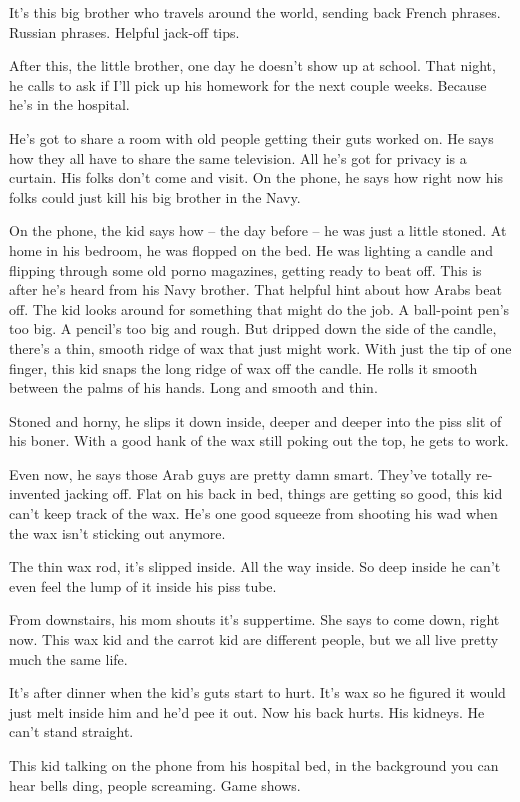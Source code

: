 \documentclass[10pt,a5paper,twoside]{book}
\begin{document}
It's this big brother who travels around the world, sending back French phrases. Russian phrases. Helpful jack-off tips.

After this, the little brother, one day he doesn't show up at school. That night, he calls to ask if I'll pick up his homework for the next couple weeks. Because he's in the hospital.

He's got to share a room with old people getting their guts worked on. He says how they all have to share the same television. All he's got for privacy is a curtain. His folks don't come and visit. On the phone, he says how right now his folks could just kill his big brother in the Navy.

On the phone, the kid says how -- the day before -- he was just a little stoned. At home in his bedroom, he was flopped on the bed. He was lighting a candle and flipping through some old porno magazines, getting ready to beat off. This is after he's heard from his Navy brother. That helpful hint about how Arabs beat off. The kid looks around for something that might do the job. A ball-point pen's too big. A pencil's too big and rough. But dripped down the side of the candle, there's a thin, smooth ridge of wax that just might work. With just the tip of one finger, this kid snaps the long ridge of wax off the candle. He rolls it smooth between the palms of his hands. Long and smooth and thin.

Stoned and horny, he slips it down inside, deeper and deeper into the piss slit of his boner. With a good hank of the wax still poking out the top, he gets to work.

Even now, he says those Arab guys are pretty damn smart. They've totally re-invented jacking off. Flat on his back in bed, things are getting so good, this kid can't keep track of the wax. He's one good squeeze from shooting his wad when the wax isn't sticking out anymore.

The thin wax rod, it's slipped inside. All the way inside. So deep inside he can't even feel the lump of it inside his piss tube.

From downstairs, his mom shouts it's suppertime. She says to come down, right now. This wax kid and the carrot kid are different people, but we all live pretty much the same life.

It's after dinner when the kid's guts start to hurt. It's wax so he figured it would just melt inside him and he'd pee it out. Now his back hurts. His kidneys. He can't stand straight.

This kid talking on the phone from his hospital bed, in the background you can hear bells ding, people screaming. Game shows.
\end{document}

